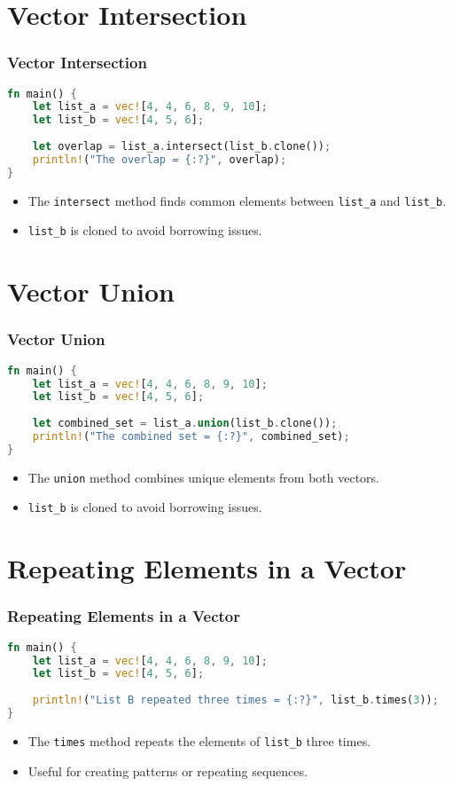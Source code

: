 \documentclass[aspectratio=169, table]{beamer}
\begin{document}
\section{Vector Intersection}
\begin{frame}[fragile]
\frametitle{Vector Intersection}
\begin{lstlisting}[language=Rust]
fn main() {
	let list_a = vec![4, 4, 6, 8, 9, 10];
	let list_b = vec![4, 5, 6];
	
	let overlap = list_a.intersect(list_b.clone());
	println!("The overlap = {:?}", overlap);
}
\end{lstlisting}
\begin{itemize}
\item The \texttt{intersect} method finds common elements between \texttt{list\_a} and \texttt{list\_b}.
\item \texttt{list\_b} is cloned to avoid borrowing issues.
\end{itemize}
\end{frame}

\section{Vector Union}
\begin{frame}[fragile]
\frametitle{Vector Union}
\begin{lstlisting}[language=Rust]
fn main() {
	let list_a = vec![4, 4, 6, 8, 9, 10];
	let list_b = vec![4, 5, 6];
	
	let combined_set = list_a.union(list_b.clone());
	println!("The combined set = {:?}", combined_set);
}
\end{lstlisting}
\begin{itemize}
\item The \texttt{union} method combines unique elements from both vectors.
\item \texttt{list\_b} is cloned to avoid borrowing issues.
\end{itemize}
\end{frame}

\section{Repeating Elements in a Vector}
\begin{frame}[fragile]
\frametitle{Repeating Elements in a Vector}
\begin{lstlisting}[language=Rust]
fn main() {
	let list_a = vec![4, 4, 6, 8, 9, 10];
	let list_b = vec![4, 5, 6];
	
	println!("List B repeated three times = {:?}", list_b.times(3));
}
\end{lstlisting}
\begin{itemize}
\item The \texttt{times} method repeats the elements of \texttt{list\_b} three times.
\item Useful for creating patterns or repeating sequences.
\end{itemize}
\end{frame}
\end{document}
